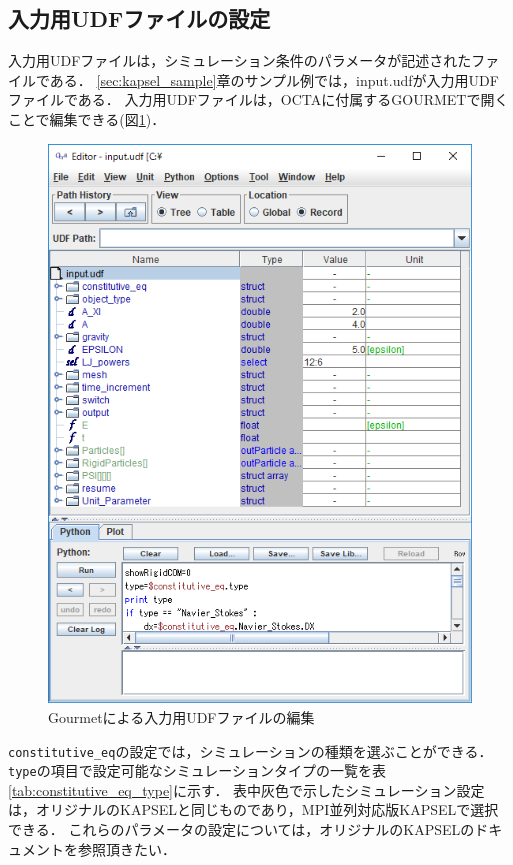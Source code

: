 \documentclass[pdflatex,a4paper,10pt,ja=standard]{bxjsarticle}
\begin{document}
\subsection{入力用UDFファイルの設定}

入力用UDFファイルは，シミュレーション条件のパラメータが記述されたファイルである．
\ref{sec:kapsel_sample}章のサンプル例では，input.udfが入力用UDFファイルである．
入力用UDFファイルは，OCTAに付属するGOURMETで開くことで編集できる(図\ref{fig:gourmet_input})．

\begin{figure}[htbp]
    \centering
    \includegraphics[width=10truecm]{gourmet_input_ss.png}
    \caption{Gourmetによる入力用UDFファイルの編集}
    \label{fig:gourmet_input}
\end{figure}

\verb|constitutive_eq|の設定では，シミュレーションの種類を選ぶことができる．
\verb|type|の項目で設定可能なシミュレーションタイプの一覧を表\ref{tab:constitutive_eq_type}に示す．
表中灰色で示したシミュレーション設定は，オリジナルのKAPSELと同じものであり，MPI並列対応版KAPSELで選択できる．
これらのパラメータの設定については，オリジナルのKAPSELのドキュメント\autocite{shinkagaku2017octa}を参照頂きたい．
\end{document}
